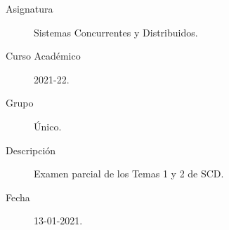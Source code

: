 \documentclass[12pt]{article}
\begin{document}

    
    

    \begin{description}
        \item[Asignatura] Sistemas Concurrentes y Distribuidos.
        \item[Curso Académico] 2021-22.
        \item[Grupo] Único.
        \item[Descripción] Examen parcial de los Temas 1 y 2 de SCD.
        \item[Fecha] 13-01-2021.
    \end{description}
    \newpage


    
\end{document}
